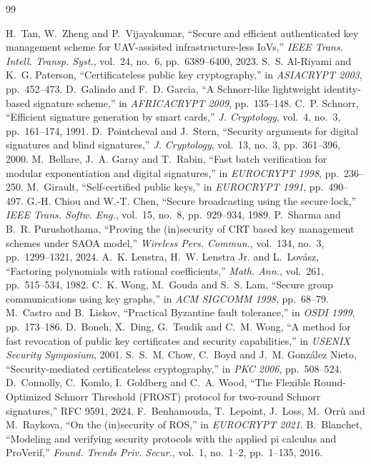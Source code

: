 \documentclass[11pt,openany]{report}
\begin{document}
\renewcommand{\bibname}{References}
\begin{thebibliography}{99}
\small
{} H.~Tan, W.~Zheng and P.~Vijayakumar, ``Secure and efficient authenticated key management scheme for UAV-assisted infrastructure-less
IoVs,'' \emph{IEEE Trans. Intell. Transp. Syst.}, vol.~24, no.~6, pp.~6389--6400, 2023.
 S.~S. Al-Riyami and K.~G. Paterson, ``Certificateless public key cryptography,'' in \emph{ASIACRYPT 2003}, pp.~452--473.
 D.~Galindo and F.~D. Garcia, ``A Schnorr-like lightweight identity-based signature scheme,'' in \emph{AFRICACRYPT 2009}, pp.~135--148.
 C.~P. Schnorr, ``Efficient signature generation by smart cards,'' \emph{J. Cryptology}, vol.~4, no.~3, pp.~161--174, 1991.
 D.~Pointcheval and J.~Stern, ``Security arguments for digital signatures and blind signatures,'' \emph{J. Cryptology}, vol.~13,
no.~3, pp.~361--396, 2000.
 M.~Bellare, J.~A. Garay and T.~Rabin, ``Fast batch verification for modular exponentiation and digital signatures,'' in
\emph{EUROCRYPT 1998}, pp.~236--250.
 M.~Girault, ``Self-certified public keys,'' in \emph{EUROCRYPT 1991}, pp.~490--497.
 G.-H. Chiou and W.-T. Chen, ``Secure broadcasting using the secure lock,'' \emph{IEEE Trans. Softw. Eng.}, vol.~15, no.~8,
pp.~929--934, 1989.
 P.~Sharma and B.~R. Purushothama, ``Proving the (in)security of CRT based key management schemes under SAOA model,''
\emph{Wireless Pers. Commun.}, vol.~134, no.~3, pp.~1299--1321, 2024.
 A.~K. Lenstra, H.~W. Lenstra Jr. and L.~Lov\'asz, ``Factoring polynomials with rational coefficients,'' \emph{Math. Ann.}, vol.~261,
pp.~515--534, 1982.
 C.~K. Wong, M.~Gouda and S.~S. Lam, ``Secure group communications using key graphs,'' in \emph{ACM SIGCOMM 1998}, pp.~68--79.
 M.~Castro and B.~Liskov, ``Practical Byzantine fault tolerance,'' in \emph{OSDI 1999}, pp.~173--186.
 D.~Boneh, X.~Ding, G.~Tsudik and C.~M. Wong, ``A method for fast revocation of public key certificates and security capabilities,''
in \emph{USENIX Security Symposium}, 2001.
 S.~S.~M. Chow, C.~Boyd and J.~M. Gonz\'alez Nieto, ``Security-mediated certificateless cryptography,'' in \emph{PKC 2006}, pp.~508--524.
 D.~Connolly, C.~Komlo, I.~Goldberg and C.~A. Wood, ``The Flexible Round-Optimized Schnorr Threshold (FROST) protocol for two-round
Schnorr signatures,'' RFC 9591, 2024.
 F.~Benhamouda, T.~Lepoint, J.~Loss, M.~Orr\`u and M.~Raykova, ``On the (in)security of ROS,'' in \emph{EUROCRYPT 2021}.
 B.~Blanchet, ``Modeling and verifying security protocols with the applied pi calculus and ProVerif,'' \emph{Found. Trends Priv.
Secur.}, vol.~1, no.~1--2, pp.~1--135, 2016.
\end{thebibliography}
\end{document}
